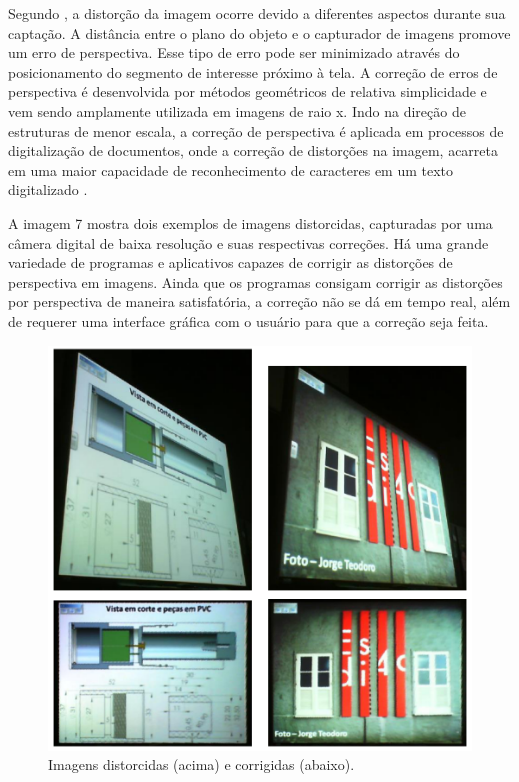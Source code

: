 Segundo , a distorção da imagem ocorre devido a diferentes aspectos durante sua captação. A distância entre o plano do objeto e o capturador de imagens promove um erro de perspectiva. Esse tipo de erro pode ser minimizado através do posicionamento do segmento de interesse próximo à tela. A correção de erros de perspectiva é desenvolvida por métodos geométricos de relativa simplicidade e vem sendo amplamente utilizada em imagens de raio x. Indo na direção de estruturas de menor escala, a correção de perspectiva é aplicada em processos de digitalização de documentos, onde a correção de distorções na imagem, acarreta em uma maior capacidade de reconhecimento de caracteres em um texto digitalizado \cite{Pereira}. 

A imagem 7 mostra dois exemplos de imagens distorcidas, capturadas por uma câmera digital de baixa resolução e suas respectivas correções. Há uma grande variedade de programas e aplicativos capazes de corrigir as distorções de perspectiva em imagens. Ainda que os programas consigam corrigir as distorções por perspectiva de maneira satisfatória, a correção não se dá em tempo real, além de requerer uma interface gráfica com o usuário para que a correção seja feita.
 \begin{figure}[!h]
	\centering
	\includegraphics[width=1.0\textwidth]{Imagens/imagensdistorcidas} 
	\caption[Imagens distorcidas e corrigidas.]{Imagens distorcidas (acima) e corrigidas (abaixo).}
	\label{fig:tux_laplace}
\end{figure}

